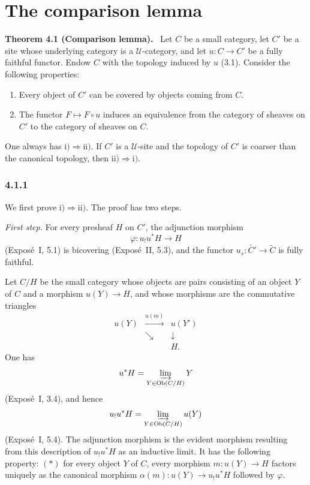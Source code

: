 \documentclass[11pt]{article}
\newcommand{\U}{\mathcal{U}}
\newcommand{\Ob}{\operatorname{Ob}}
\newenvironment{statement}[1]{\par\medskip\noindent\textbf{#1.}\ }{\par\medskip}
\begin{document}
\section{The comparison lemma}

\begin{statement}{Theorem 4.1 (Comparison lemma)}
Let \(C\) be a small category, let \(C'\) be a site whose underlying category is a \(\U\)-category, and let \(u:C\to C'\) be a fully faithful functor. Endow \(C\) with the topology induced by \(u\) (3.1). Consider the following properties:
\begin{enumerate}[label=\roman*)]
\item Every object of \(C'\) can be covered by objects coming from \(C\).
\item The functor \(F\mapsto F\circ u\) induces an equivalence from the category of sheaves on \(C'\) to the category of sheaves on \(C\).
\end{enumerate}
One always has \(\mathrm{i})\Rightarrow\mathrm{ii})\). If \(C'\) is a \(\U\)-site and the topology of \(C'\) is coarser than the canonical topology, then \(\mathrm{ii})\Rightarrow\mathrm{i})\).
\end{statement}

\subsubsection*{4.1.1}
We first prove \(\mathrm{i})\Rightarrow\mathrm{ii})\). The proof has two steps.

\emph{First step.} For every presheaf \(H\) on \(C'\), the adjunction morphism
\[
\varphi:u_!u^*H\longrightarrow H
\]
(Expos\'e~I, 5.1) is bicovering (Expos\'e~II, 5.3), and the functor \(u_s:\widetilde{C'}\to\widetilde C\) is fully faithful.

Let \(C/H\) be the small category whose objects are pairs consisting of an object \(Y\) of \(C\) and a morphism \(u(Y)\to H\), and whose morphisms are the commutative triangles
\[
\begin{array}{ccc}
u(Y)&\xrightarrow{u(m)}&u(Y')\\
&\searrow&\downarrow\\
&&H.
\end{array}
\]
One has
\[
u^*H=\varinjlim_{Y\in\Ob(C/H)}Y
\]
(Expos\'e~I, 3.4), and hence
\[
u_!u^*H=\varinjlim_{Y\in\Ob(C/H)}u(Y)
\]
(Expos\'e~I, 5.4). The adjunction morphism is the evident morphism resulting from this description of \(u_!u^*H\) as an inductive limit. It has the following property: \((*)\) for every object \(Y\) of \(C\), every morphism \(m:u(Y)\to H\) factors uniquely as the canonical morphism \(\alpha(m):u(Y)\to u_!u^*H\) followed by \(\varphi\).
\end{document}

